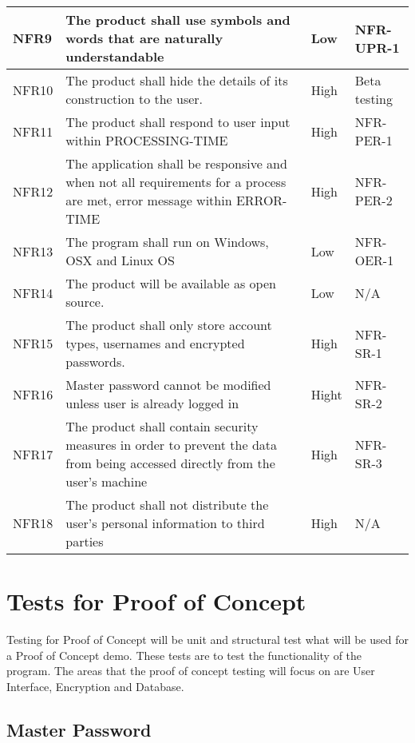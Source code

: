 \documentclass[12pt, titlepage]{article}
\begin{document}
\begin{table}[!htbp]
    \begin{tabularx}{\textwidth}{p{2cm}Xp{2cm}X}
        \midrule

        NFR9  & The product shall use symbols and words that are naturally understandable & Low & NFR-UPR-1\\\hline
        NFR10 & The product shall hide the details of its construction to the user. & High & Beta testing\\\hline
        NFR11 & The product shall respond to user input within PROCESSING-TIME & High & NFR-PER-1\\\hline
        NFR12 & The application shall be responsive and when not all requirements for a process are met, error message within ERROR-TIME & High & NFR-PER-2\\\hline
        NFR13 & The program shall run on Windows, OSX and Linux OS & Low & NFR-OER-1\\\hline
        NFR14 & The product will be available as open source. & Low & N/A\\\hline
        NFR15 & The product shall only store account types, usernames and encrypted passwords. & High & NFR-SR-1\\\hline
        NFR16 & Master password cannot be modified unless user is already logged in & Hight & NFR-SR-2\\\hline
        NFR17 & The product shall contain security measures in order to prevent the data from being accessed directly from the user’s machine & High & NFR-SR-3\\\hline
        NFR18 & The product shall not distribute the user’s personal information to third parties & High & N/A\\

        \bottomrule

    \end{tabularx}
\end{table}

\section{Tests for Proof of Concept}

Testing for Proof of Concept will be unit and structural test what will be used for a Proof of Concept demo. These tests are to test the functionality of the program. The areas that the proof of concept testing will focus on are User Interface, Encryption and Database.

\subsection{Master Password}
\end{document}
